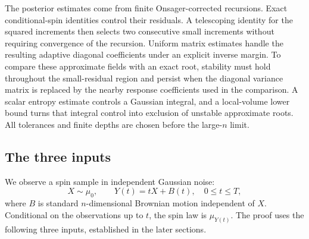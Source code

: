 The posterior estimates come from finite Onsager-corrected recursions.
Exact conditional-spin identities control their residuals. A telescoping
identity for the squared increments then selects two consecutive small
increments without requiring convergence of the recursion. Uniform matrix
estimates handle
the resulting adaptive diagonal coefficients under an explicit inverse
margin. To compare these approximate fields with an exact root, stability
must hold throughout the small-residual region and persist when the
diagonal variance matrix is replaced by the nearby response coefficients
used in the comparison. A scalar entropy estimate controls a Gaussian
integral, and
a local-volume lower bound turns that integral control into exclusion of
unstable approximate roots. All tolerances and finite depths are chosen
before the large-$n$ limit.

\subsection{The three inputs}
We observe a spin sample in independent Gaussian noise:
\begin{equation}\label{eq:observation-process}
 X\sim\mu_0,\qquad Y(t)=tX+B(t),\quad 0\le t\le T,
\end{equation}
where $B$ is standard $n$-dimensional Brownian motion independent of $X$.
Conditional on the observations up to $t$, the spin law is $\mu_{Y(t)}$.
The proof uses the following three inputs, established in the later sections.

